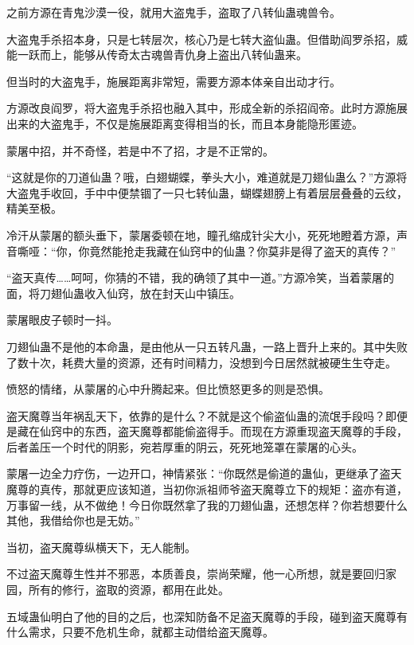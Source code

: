 
\begin{this_body}



之前方源在青鬼沙漠一役，就用大盗鬼手，盗取了八转仙蛊魂兽令。

大盗鬼手杀招本身，只是七转层次，核心乃是七转大盗仙蛊。但借助阎罗杀招，威能一跃而上，能够从传奇太古魂兽青仇身上盗出八转仙蛊来。

但当时的大盗鬼手，施展距离非常短，需要方源本体亲自出动才行。

方源改良阎罗，将大盗鬼手杀招也融入其中，形成全新的杀招阎帝。此时方源施展出来的大盗鬼手，不仅是施展距离变得相当的长，而且本身能隐形匿迹。

蒙屠中招，并不奇怪，若是中不了招，才是不正常的。

“这就是你的刀道仙蛊？哦，白翅蝴蝶，拳头大小，难道就是刀翅仙蛊么？”方源将大盗鬼手收回，手中中便禁锢了一只七转仙蛊，蝴蝶翅膀上有着层层叠叠的云纹，精美至极。

冷汗从蒙屠的额头垂下，蒙屠委顿在地，瞳孔缩成针尖大小，死死地瞪着方源，声音嘶哑：“你，你竟然能抢走我藏在仙窍中的仙蛊？你莫非是得了盗天的真传？”

“盗天真传……呵呵，你猜的不错，我的确领了其中一道。”方源冷笑，当着蒙屠的面，将刀翅仙蛊收入仙窍，放在封天山中镇压。

蒙屠眼皮子顿时一抖。

刀翅仙蛊不是他的本命蛊，是由他从一只五转凡蛊，一路上晋升上来的。其中失败了数十次，耗费大量的资源，还有时间精力，没想到今日居然就被硬生生夺走。

愤怒的情绪，从蒙屠的心中升腾起来。但比愤怒更多的则是恐惧。

盗天魔尊当年祸乱天下，依靠的是什么？不就是这个偷盗仙蛊的流氓手段吗？即便是藏在仙窍中的东西，盗天魔尊都能偷盗得手。而现在方源重现盗天魔尊的手段，后者盖压一个时代的阴影，宛若厚重的阴云，死死地笼罩在蒙屠的心头。

蒙屠一边全力疗伤，一边开口，神情紧张：“你既然是偷道的蛊仙，更继承了盗天魔尊的真传，那就更应该知道，当初你派祖师爷盗天魔尊立下的规矩：盗亦有道，万事留一线，从不做绝！今日你既然拿了我的刀翅仙蛊，还想怎样？你若想要什么其他，我借给你也是无妨。”

当初，盗天魔尊纵横天下，无人能制。

不过盗天魔尊生性并不邪恶，本质善良，崇尚荣耀，他一心所想，就是要回归家园，所有的修行，盗取的资源，都用在此处。

五域蛊仙明白了他的目的之后，也深知防备不足盗天魔尊的手段，碰到盗天魔尊有什么需求，只要不危机生命，就都主动借给盗天魔尊。


\end{this_body}
